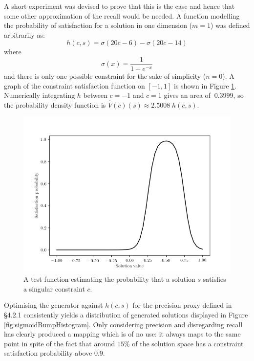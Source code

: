 \documentclass[../../main.tex]{subfiles}
\begin{document}
A short experiment was devised to prove that this is the case and hence that some other approximation of the recall would be needed.
A function modelling the probability of satisfaction for a solution in one dimension ($m=1$) was defined arbitrarily as:
$$h(c,s) = \sigma(20c - 6) - \sigma(20c - 14)$$
where
$$\sigma(x)=\frac{1}{1+e^{-x}}$$
and there is only one possible constraint for the sake of simplicity ($n=0$).
A graph of the constraint satisfaction function on $[-1, 1]$ is shown in Figure \ref{fig:sigmoidBumpFunction}.
Numerically integrating $h$ between $c=-1$ and $c=1$ gives an area of $~0.3999$, so the probability density function is $\hat{V}(c)(s) \approx 2.5008 \; h(c,s)$.

\begin{figure}
    \begin{center}
    \includegraphics[width=\textwidth]{sigmoidBumpFunction}
    \caption{
        A test function estimating the probability that a solution $s$ satisfies a singular constraint $c$.
    }
    \label{fig:sigmoidBumpFunction}
    \end{center}
\end{figure}

Optimising the generator against $h(c, s)$ for the precision proxy defined in \S 4.2.1 consistently yields a distribution of generated solutions displayed in Figure \ref{fig:sigmoidBumpHistogram}.
Only considering precision and disregarding recall has clearly produced a mapping which is of no use: it always maps to the same point in spite of the fact that around $15\%$ of the solution space has a constraint satisfaction probability above $0.9$.
\end{document}
